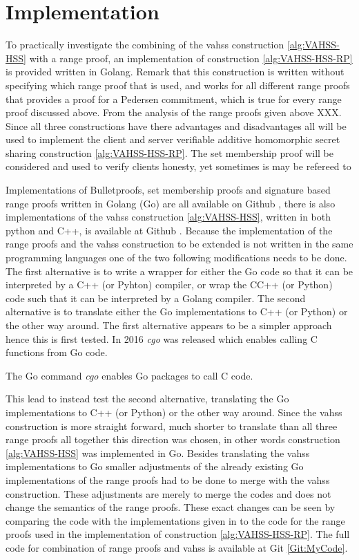 \section{Implementation}
To practically investigate the combining of the vahss construction \ref{alg:VAHSS-HSS} with a range proof, an implementation of construction \ref{alg:VAHSS-HSS-RP} is provided written in Golang. Remark that this construction is written without specifying which range proof that is used, and works for all different range proofs that provides a proof for a Pedersen commitment, which is true for every range proof discussed above. From the analysis of the range proofs given above XXX. Since all three constructions have there advantages and disadvantages all will be used to implement the client and server verifiable additive homomorphic secret sharing construction \ref{alg:VAHSS-HSS-RP}. The set membership proof will be considered and used to verify clients honesty, yet sometimes is may be refereed to 

Implementations of Bulletproofs, set membership proofs and signature based range proofs written in Golang (Go) are all available on Github \cite{Git:RP}, there is also   implementations of the vahss construction \ref{alg:VAHSS-HSS}, written in both python and C++, is available at Github \cite{Git:python_vahss} \cite{Git:C_vahss}.
Because the implementation of the range proofs and the vahss construction to be extended is not written in the same programming languages one of the two following modifications needs to be done. The first alternative is to write a wrapper for either the Go code so that it can be interpreted by a C++ (or Pyhton) compiler, or wrap the CC++ (or Python) code such that it can be interpreted by a Golang compiler. The second alternative is to translate either the Go implementations to C++ (or Python) or the other way around. The first alternative appears to be a simpler approach hence this is first tested. In 2016 \textit{cgo} was released which enables calling C functions from Go code. 

The Go command \textit{cgo} enables Go packages to call C code. 


This lead to instead test the second alternative, translating  the Go implementations to C++ (or Python) or the other way around. Since the vahss construction is more straight forward, much shorter to translate than all three range proofs all together this direction was chosen, in other words construction \ref{alg:VAHSS-HSS} was implemented in Go. Besides translating the vahss implementations to Go smaller adjustments of the already existing Go implementations of the range proofs had to be done to merge with the vahss construction. These adjustments are merely to merge the codes and does not change the semantics of the range proofs. These exact changes can be seen by comparing the code with the implementations given in \cite{Git:RP} to the code for the range proofs used in the implementation of construction \ref{alg:VAHSS-HSS-RP}. The full code for combination of range proofs and vahss is available at Git \ref{Git:MyCode}. 

